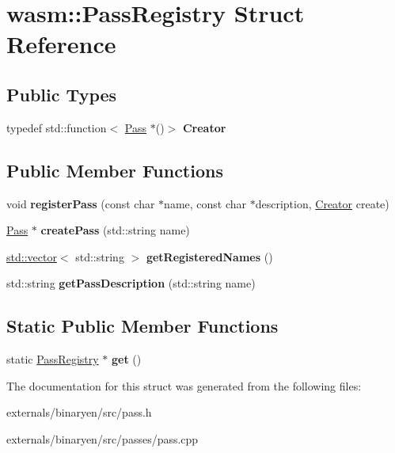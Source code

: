 \hypertarget{structwasm_1_1_pass_registry}{}\section{wasm\+:\+:Pass\+Registry Struct Reference}
\label{structwasm_1_1_pass_registry}
\subsection*{Public Types}
\begin{DoxyCompactItemize}
\item 
\mbox{\label{structwasm_1_1_pass_registry_a8a991934bcd9fbf1264d96b6747039df}} 
typedef std\+::function$<$ \mbox{\hyperlink{classwasm_1_1_pass}{Pass}} $\ast$()$>$ {\bfseries Creator}
\end{DoxyCompactItemize}
\subsection*{Public Member Functions}
\begin{DoxyCompactItemize}
\item 
\mbox{\label{structwasm_1_1_pass_registry_a13ccf6ec13a7991e03e8c954f8730846}} 
void {\bfseries register\+Pass} (const char $\ast$name, const char $\ast$description, \mbox{\hyperlink{struct_creator}{Creator}} create)
\item 
\mbox{\label{structwasm_1_1_pass_registry_af69f8a12b6c86e93173d0fdab6ace694}} 
\mbox{\hyperlink{classwasm_1_1_pass}{Pass}} $\ast$ {\bfseries create\+Pass} (std\+::string name)
\item 
\mbox{\label{structwasm_1_1_pass_registry_a60ce1410defd82d7c221d7f49ec54536}} 
\mbox{\hyperlink{classstd_1_1vector}{std\+::vector}}$<$ std\+::string $>$ {\bfseries get\+Registered\+Names} ()
\item 
\mbox{\label{structwasm_1_1_pass_registry_aa167b4a8bec90a34d45520c69ee47115}} 
std\+::string {\bfseries get\+Pass\+Description} (std\+::string name)
\end{DoxyCompactItemize}
\subsection*{Static Public Member Functions}
\begin{DoxyCompactItemize}
\item 
\mbox{\label{structwasm_1_1_pass_registry_a4b54bdae371e7f42fc2346f898ae36a0}} 
static \mbox{\hyperlink{structwasm_1_1_pass_registry}{Pass\+Registry}} $\ast$ {\bfseries get} ()
\end{DoxyCompactItemize}


The documentation for this struct was generated from the following files\+:\begin{DoxyCompactItemize}
\item 
externals/binaryen/src/pass.\+h\item 
externals/binaryen/src/passes/pass.\+cpp\end{DoxyCompactItemize}

